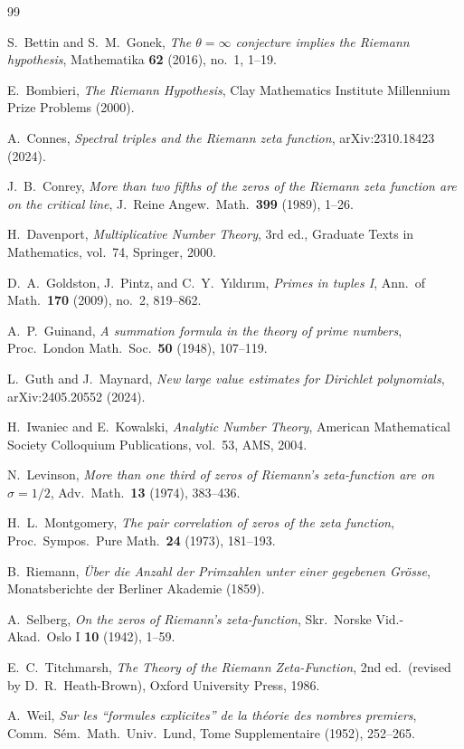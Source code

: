 \documentclass[12pt]{article}
\theoremstyle{remark}
\begin{document}
\begin{thebibliography}{99}

S.~Bettin and S.~M.~Gonek,
\emph{The $\theta = \infty$ conjecture implies the Riemann hypothesis},
Mathematika \textbf{62} (2016), no.~1, 1--19.

E.~Bombieri,
\emph{The Riemann Hypothesis},
Clay Mathematics Institute Millennium Prize Problems (2000).

A.~Connes,
\emph{Spectral triples and the Riemann zeta function},
arXiv:2310.18423 (2024).

J.~B.~Conrey,
\emph{More than two fifths of the zeros of the Riemann zeta function are on the critical line},
J.~Reine Angew.~Math.\ \textbf{399} (1989), 1--26.

H.~Davenport,
\emph{Multiplicative Number Theory},
3rd ed., Graduate Texts in Mathematics, vol.~74, Springer, 2000.

D.~A.~Goldston, J.~Pintz, and C.~Y.~Y{\i}ld{\i}r{\i}m,
\emph{Primes in tuples I},
Ann.\ of Math.\ \textbf{170} (2009), no.~2, 819--862.

A.~P.~Guinand,
\emph{A summation formula in the theory of prime numbers},
Proc.\ London Math.\ Soc.\ \textbf{50} (1948), 107--119.

L.~Guth and J.~Maynard,
\emph{New large value estimates for Dirichlet polynomials},
arXiv:2405.20552 (2024).

H.~Iwaniec and E.~Kowalski,
\emph{Analytic Number Theory},
American Mathematical Society Colloquium Publications, vol.~53, AMS, 2004.

N.~Levinson,
\emph{More than one third of zeros of Riemann's zeta-function are on $\sigma = 1/2$},
Adv.\ Math.\ \textbf{13} (1974), 383--436.

H.~L.~Montgomery,
\emph{The pair correlation of zeros of the zeta function},
Proc.\ Sympos.\ Pure Math.\ \textbf{24} (1973), 181--193.

B.~Riemann,
\emph{{\"U}ber die Anzahl der Primzahlen unter einer gegebenen Gr{\"o}sse},
Monatsberichte der Berliner Akademie (1859).

A.~Selberg,
\emph{On the zeros of Riemann's zeta-function},
Skr.\ Norske Vid.-Akad.\ Oslo I \textbf{10} (1942), 1--59.

E.~C.~Titchmarsh,
\emph{The Theory of the Riemann Zeta-Function},
2nd ed.\ (revised by D.~R.~Heath-Brown), Oxford University Press, 1986.

A.~Weil,
\emph{Sur les ``formules explicites'' de la th{\'e}orie des nombres premiers},
Comm.\ S{\'e}m.\ Math.\ Univ.\ Lund, Tome Supplementaire (1952), 252--265.

\end{thebibliography}
\end{document}
